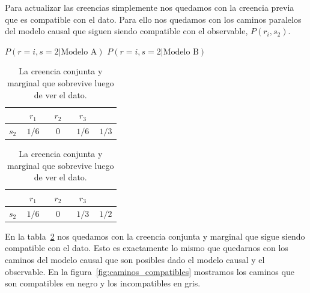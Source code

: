 \documentclass[a4paper,11pt]{book}
\theoremstyle{definition}
\begin{document}
Para actualizar las creencias simplemente nos quedamos con la creencia previa que es compatible con el dato.
%
Para ello nos quedamos con los caminos paralelos del modelo causal que siguen siendo compatible con el observable, $P(r_i, s_2)$.
%
\begin{table}[ht!]
\centering
$P(r=i, s=2 | \text{Modelo A})$ \hspace{2.7cm} $P(r=i, s=2 | \text{Modelo B})$ \\[0.1cm]
\begin{tabular}{|c|c|c|c||c|} \hline \setlength\tabcolsep{0.4cm}
       & \, $r_1$ \, &  \, $r_2$ \, & \, $r_3$ \, & \\ \hline
  $s_2$ & $1/6$ & $0$ & $1/6$ & $1/3$ \\ \hline
  \end{tabular}
  \hspace{1.5cm}
  \begin{tabular}{|c|c|c|c||c|} \hline  \setlength\tabcolsep{0.4cm}
 & \, $r_1$ \, &  \, $r_2$ \, & \, $r_3$ \, & \\ \hline
  $s_2$ & $1/6$ & $0$ & $1/3$ & $1/2$ \\ \hline
  \end{tabular}
  \caption{La creencia conjunta y marginal que sobrevive luego de ver el dato.}
  \label{tab:creencia_compatible}
\end{table}

En la tabla~\ref{tab:creencia_compatible} nos quedamos con la creencia conjunta y marginal que sigue siendo compatible con el dato.
%
Esto es exactamente lo mismo que quedarnos con los caminos del modelo causal que son posibles dado el modelo causal y el observable.
%
En la figura~\ref{fig:caminos_compatibles} mostramos los caminos que son compatibles en negro y los incompatibles en gris.
\end{document}
